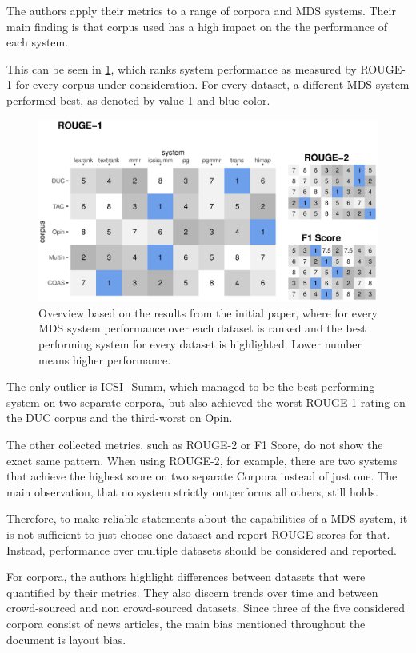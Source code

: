 \documentclass[20_original-paper.tex]{subfiles}
\begin{document}
The authors apply their metrics to a range of corpora and MDS systems. Their main finding is that corpus used has a high impact on the the performance of each system.

This can be seen in \ref{results}, which ranks system performance as measured by ROUGE-1 for every corpus under consideration. For every dataset, a different MDS system performed best, as denoted by value 1 and blue color.


\begin{figure}
    \includegraphics[width=\textwidth]{figures/results.eps}
    \caption{Overview based on the results from the initial paper, where for every MDS system performance over each dataset is ranked and the best performing system for every dataset is highlighted. Lower number means higher performance.} \label{results}
\end{figure}


The only outlier is ICSI\_Summ, which managed to be the best-performing system on two separate corpora, but also achieved the worst ROUGE-1 rating on the DUC corpus and the third-worst on Opin.


The other collected metrics, such as ROUGE-2 or F1 Score, do not show the exact same pattern.
When using ROUGE-2, for example, there are two systems that achieve the highest score on two separate Corpora instead of just one.
The main observation, that no system strictly outperforms all others, still holds.

Therefore, to make reliable statements about the capabilities of a MDS system,
it is not sufficient to just choose one dataset and report ROUGE scores for that.
Instead, performance over multiple datasets should be considered and reported.

For corpora, the authors highlight differences between datasets that were quantified by their metrics.
They also discern trends over time and between crowd-sourced and non crowd-sourced datasets.
Since three of the five considered corpora consist of news articles, the main bias mentioned throughout the document is layout bias.
\end{document}
